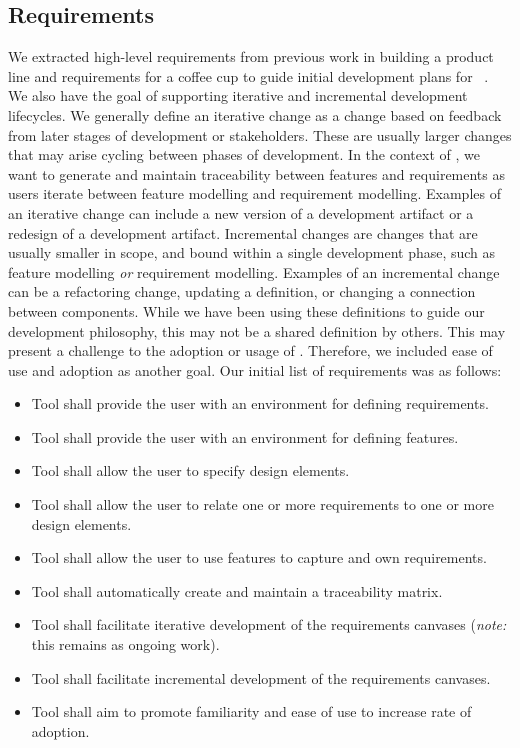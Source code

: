 \subsection{Requirements}
We extracted high-level requirements from previous work in building a product line and requirements for a coffee cup to guide initial development plans for \tool~\cite{chiang2024mapping}. We also have the goal of supporting iterative and incremental development lifecycles. We generally define an iterative change as a change based on feedback from later stages of development or stakeholders. These are usually larger changes that may arise cycling between phases of development. In the context of \tool, we want to generate and maintain traceability between features and requirements as users iterate between feature modelling and requirement modelling. Examples of an iterative change can include a new version of a development artifact or a redesign of a development artifact. Incremental changes are changes that are usually smaller in scope, and bound within a single development phase, such as feature modelling \textit{or} requirement modelling. Examples of an incremental change can be a refactoring change, updating a definition, or changing a connection between components. While we have been using these definitions to guide our development philosophy, this may not be a shared definition by others. This may present a challenge to the adoption or usage of \tool. Therefore, we included ease of use and adoption as another goal. Our initial list of requirements was as follows:


\begin{itemize}
	\item Tool shall provide the user with an environment for defining requirements.
	\item Tool shall provide the user with an environment for defining features.
	\item Tool shall allow the user to specify design elements.
	\item Tool shall allow the user to relate one or more requirements to one or more design elements.
	\item Tool shall allow the user to use features to capture and own requirements.
	\item Tool shall automatically create and maintain a traceability matrix.
	\item Tool shall facilitate iterative development of the requirements canvases (\textit{note:} this remains as ongoing work).
	\item Tool shall facilitate incremental development of the requirements canvases.
	\item Tool shall aim to promote familiarity and ease of use to increase rate of adoption.
\end{itemize}

